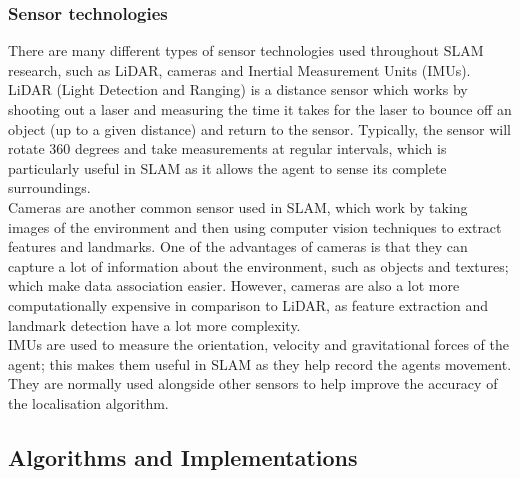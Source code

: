 \documentclass[12pt]{article}
\begin{document}
\subsubsection{Sensor technologies}
There are many different types of sensor technologies used throughout SLAM research, such as LiDAR, cameras and Inertial Measurement
Units (IMUs). LiDAR (Light Detection and Ranging) is a distance sensor which works by shooting out a laser and measuring the time it takes
for the laser to bounce off an object (up to a given distance) and return to the sensor. Typically, the sensor will rotate 360 degrees and take
measurements at regular intervals, which is particularly useful in SLAM as it allows the agent to sense its complete surroundings.\\
Cameras are another common sensor used in SLAM, which work by taking images of the environment and then using computer vision techniques
to extract features and landmarks. One of the advantages of cameras is that they can capture a lot of information about the environment, such
as objects and textures; which make data association easier. However, cameras are also a lot more computationally expensive in comparison to
LiDAR, as feature extraction and landmark detection have a lot more complexity.\\
IMUs are used to measure the orientation, velocity and gravitational forces of the agent; this makes them useful in SLAM as they help record
the agents movement. They are normally used alongside other sensors to help improve the accuracy of the localisation algorithm. \\

\subsection{Algorithms and Implementations} %
\end{document}
